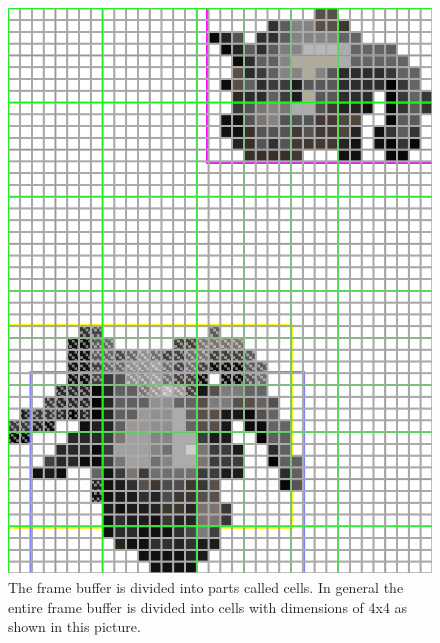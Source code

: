 \begin{figure}[!h]
  \includegraphics[width=\linewidth]{cels.png}
  \caption{
The frame buffer is divided into parts called cells. In general the entire frame 
buffer is divided into cells with dimensions of 4x4 as shown in this picture.
}
  \label{fig:cells}
\end{figure}

